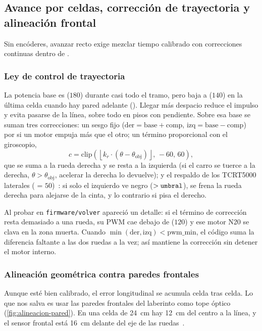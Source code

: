 \subsection{Avance por celdas, corrección de trayectoria y alineación frontal}
\label{subsec:avance-alineacion}

Sin encóderes, avanzar recto exige mezclar tiempo calibrado con correcciones continuas dentro de .

\subsubsection{Ley de control de trayectoria}
La potencia base es  ($180$) durante casi todo el tramo, pero baja a  ($140$) en la última celda cuando hay pared adelante (). Llegar más despacio reduce el impulso y evita pasarse de la línea, sobre todo en pisos con pendiente. Sobre esa base se suman tres correcciones: un sesgo fijo  ($\text{der} = \text{base} + \text{comp}$, $\text{izq} = \text{base} - \text{comp}$) por si un motor empuja más que el otro; un término proporcional con el giroscopio,
\begin{equation}
  c = \mathrm{clip}\!\left(\left\lfloor k_r \cdot (\theta - \theta_{\text{obj}}) \right\rfloor,\, -60,\, 60\right),
  \label{eq:control-rumbo}
\end{equation}
que se suma a la rueda derecha y se resta a la izquierda (si el carro se tuerce a la derecha, $\theta > \theta_{\text{obj}}$, acelerar la derecha lo devuelve); y el respaldo de los TCRT5000 laterales ( = $50$)~\cite{vishay2012tcrt5000}: si solo el izquierdo ve negro ($>\texttt{umbral}$), se frena la rueda derecha para alejarse de la cinta, y lo contrario si pisa el derecho.

Al probar  en \texttt{firmware/volver} apareció un detalle: si el término de corrección resta demasiado a una rueda, su PWM cae debajo de  ($120$) y ese motor N20 se clava en la zona muerta. Cuando $\min(\text{der}, \text{izq}) < \text{pwm\_min}$, el código suma la diferencia faltante a las dos ruedas a la vez; así mantiene la corrección sin detener el motor interno.

\subsubsection{Alineación geométrica contra paredes frontales}
Aunque  esté bien calibrado, el error longitudinal se acumula celda tras celda. Lo que nos salva es usar las paredes frontales del laberinto como tope óptico (\cref{fig:alineacion-pared}). En una celda de \SI{24}{\centi\meter} hay \SI{12}{\centi\meter} del centro a la línea, y el sensor frontal está \SI{16}{\centi\meter} delante del eje de las ruedas~\cite{arquitectura2026doc}.

